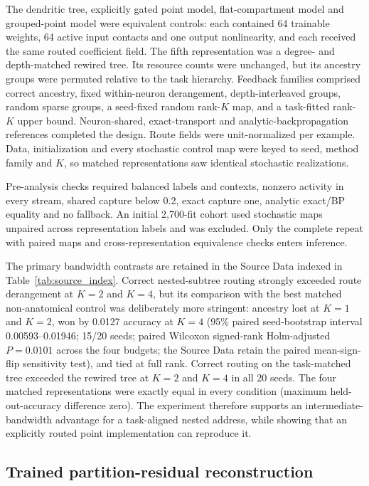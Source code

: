 The dendritic tree, explicitly gated point model, flat-compartment model and
grouped-point model were equivalent controls: each contained 64
trainable weights, 64 active input contacts and one output nonlinearity, and
each received the same routed coefficient field. The fifth representation was
a degree- and depth-matched rewired tree. Its resource counts were unchanged,
but its ancestry groups were permuted relative to the task hierarchy. Feedback
families comprised correct ancestry, fixed within-neuron derangement,
depth-interleaved groups, random sparse groups, a seed-fixed random rank-$K$
map, and a task-fitted rank-$K$ upper bound. Neuron-shared, exact-transport and
analytic-backpropagation references completed the design. Route fields were
unit-normalized per example. Data, initialization and every
stochastic control map were keyed to seed, method family and $K$, so matched
representations saw identical stochastic realizations.

Pre-analysis checks required balanced labels and contexts, nonzero activity in every stream, shared capture below 0.2, exact capture one, analytic exact/BP equality and no fallback. An initial 2,700-fit cohort used stochastic maps unpaired across representation labels and was excluded. Only the complete repeat with paired maps and cross-representation equivalence checks enters inference.

The primary bandwidth contrasts are retained in the Source Data indexed in Table~\ref{tab:source_index}.
Correct nested-subtree routing strongly exceeded route derangement at $K=2$ and $K=4$, but
its comparison with the best matched non-anatomical control was deliberately
more stringent: ancestry lost at $K=1$ and $K=2$, won by 0.0127 accuracy at
$K=4$ (95\% paired seed-bootstrap interval 0.00593--0.01946; 15/20 seeds;
paired Wilcoxon signed-rank Holm-adjusted $P=0.0101$ across the four budgets;
the Source Data retain the paired mean-sign-flip sensitivity test), and tied at full rank. Correct routing on the
task-matched tree exceeded the rewired tree at $K=2$ and $K=4$ in all 20
seeds. The four matched representations were exactly equal in every condition
(maximum held-out-accuracy difference zero). The experiment therefore supports
an intermediate-bandwidth advantage for a task-aligned nested address, while
showing that an explicitly routed point implementation can reproduce it.

\subsection{Trained partition-residual reconstruction}

